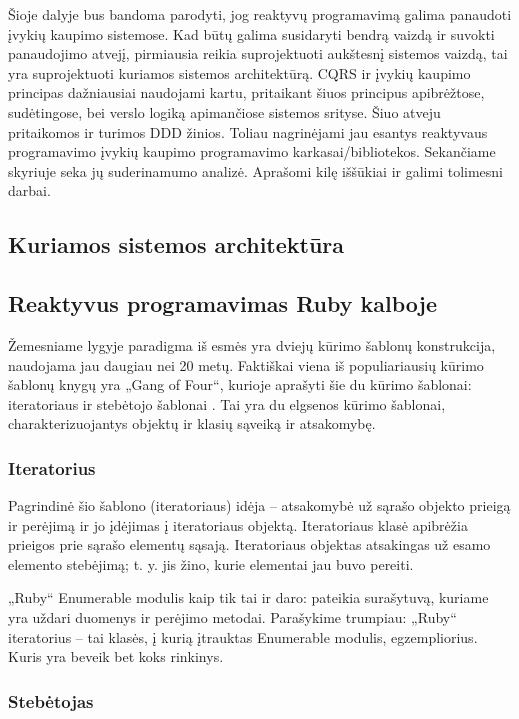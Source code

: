   Šioje dalyje bus bandoma parodyti, jog reaktyvų programavimą galima panaudoti įvykių kaupimo sistemose. Kad būtų galima susidaryti bendrą vaizdą ir suvokti panaudojimo atvejį, pirmiausia reikia suprojektuoti aukštesnį sistemos vaizdą, tai yra suprojektuoti kuriamos sistemos architektūrą. CQRS ir įvykių kaupimo principas dažniausiai naudojami kartu, pritaikant šiuos principus apibrėžtose, sudėtingose, bei verslo logiką apimančiose sistemos srityse. Šiuo atveju pritaikomos ir turimos DDD žinios. Toliau nagrinėjami jau esantys reaktyvaus programavimo įvykių kaupimo programavimo karkasai/bibliotekos. Sekančiame skyriuje seka jų suderinamumo analizė. Aprašomi kilę iššūkiai ir galimi tolimesni darbai.

\subsection{Kuriamos sistemos architektūra}

\subsection{Reaktyvus programavimas Ruby kalboje}

Žemesniame lygyje paradigma iš esmės yra dviejų kūrimo šablonų konstrukcija, naudojama jau daugiau nei 20 metų. Faktiškai viena iš populiariausių kūrimo šablonų knygų yra „Gang of Four“, kurioje aprašyti šie du kūrimo šablonai: iteratoriaus ir stebėtojo šablonai \cite{GOF:DesignPattern}. Tai yra du elgsenos kūrimo šablonai, charakterizuojantys objektų ir klasių sąveiką ir atsakomybę.

\subsubsection{Iteratorius}

Pagrindinė šio šablono (iteratoriaus) idėja – atsakomybė už sąrašo objekto prieigą ir perėjimą ir jo įdėjimas į iteratoriaus objektą. Iteratoriaus klasė apibrėžia prieigos prie sąrašo elementų sąsają. Iteratoriaus objektas atsakingas už esamo elemento stebėjimą; t. y. jis žino, kurie elementai jau buvo pereiti.

„Ruby“ Enumerable modulis kaip tik tai ir daro: pateikia surašytuvą, kuriame yra uždari duomenys ir perėjimo metodai. Parašykime trumpiau: „Ruby“ iteratorius – tai klasės, į kurią įtrauktas Enumerable modulis, egzempliorius. Kuris yra beveik bet koks rinkinys.

\subsubsection{Stebėtojas}

